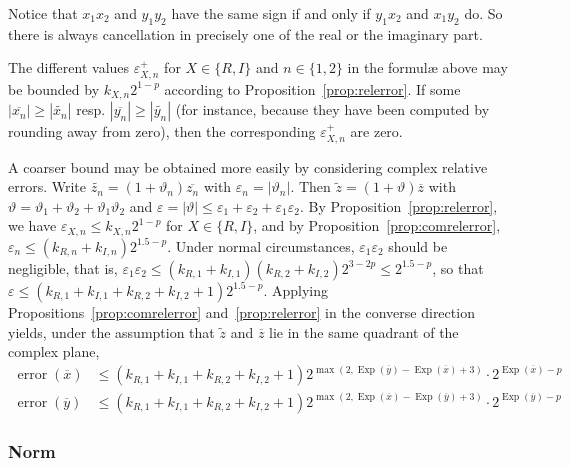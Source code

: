 \documentclass {article}
\newcommand {\corr}[1]{\widetilde {#1}}
\newcommand {\appro}[1]{\overline {#1}}
\DeclareMathOperator{\Exp}{\operatorname {Exp}}
\newcommand{\error}{\operatorname {error}}
\renewcommand {\epsilon}{\varepsilon}
\renewcommand {\theta}{\vartheta}
\renewcommand {\leq}{\leqslant}
\renewcommand {\geq}{\geqslant}
\begin{document}
Notice that $x_1 x_2$ and $y_1 y_2$ have the same sign
if and only if $y_1 x_2$ and $x_1 y_2$ do. So there is
always cancellation in precisely one of the real or the imaginary part.

The different values $\epsilon_{X, n}^+$ for $X \in \{ R, I \}$ and
$n \in \{ 1, 2 \}$ in the formul{\ae} above may be bounded by
$k_{X, n} 2^{1 - p}$ according to Proposition~\ref {prop:relerror}.
If some $|\appro {x_n}| \geq |\corr {x_n}|$ resp.
$|\appro {y_n}| \geq |\corr {y_n}|$ (for instance, because they have been
computed by rounding away from zero), then the corresponding
$\epsilon_{X, n}^+$ are zero.

A coarser bound may be obtained more easily by considering complex
relative errors. Write $\corr {z_n} = (1 + \theta_n) \appro {z_n}$
with $\epsilon_n = | \theta_n |$. Then $\corr z = (1 + \theta) \appro z$
with $\theta = \theta_1 + \theta_2 + \theta_1 \theta_2$ and
$\epsilon = |\theta| \leq \epsilon_1 + \epsilon_2 + \epsilon_1 \epsilon_2$.
By Proposition~\ref {prop:relerror},
we have $\epsilon_{X, n} \leq k_{X, n} 2^{1-p}$ for $X \in \{ R, I \}$,
and by Proposition~\ref {prop:comrelerror},
$\epsilon_n \leq  (k_{R, n} + k_{I, n}) 2^{1.5 - p}$.
Under normal circumstances, $\epsilon_1 \epsilon_2$ should be negligible,
that is, $\epsilon_1 \epsilon_2
\leq (k_{R, 1} + k_{I, 1}) (k_{R, 2} + k_{I, 2}) 2^{3 - 2 p}
\leq 2^{1.5 - p}$, so that
$\epsilon \leq (k_{R, 1} + k_{I, 1} + k_{R, 2} + k_{I, 2} + 1)
2^{1.5 - p}$.
Applying Propositions~\ref {prop:comrelerror} and~\ref {prop:relerror}
in the converse direction yields, under the assumption that $\corr z$
and $\appro z$ lie in the same quadrant of the complex plane,
\begin {equation}
\label {eq:propmulcomrel}
\begin {array}{rl}
\error (\appro x)
&\leq (k_{R, 1} + k_{I, 1} + k_{R, 2} + k_{I, 2} + 1)
2^{\max (2, \Exp (\appro y) - \Exp (\appro x) + 3)}
\cdot 2^{\Exp (\appro x) - p} \\
\error (\appro y)
&\leq (k_{R, 1} + k_{I, 1} + k_{R, 2} + k_{I, 2} + 1)
2^{\max (2, \Exp (\appro x) - \Exp (\appro y) + 3)}
\cdot 2^{\Exp (\appro y) - p}
\end {array}
\end {equation}


\subsubsection {Norm}
\label {sssec:propnorm}
\end{document}
